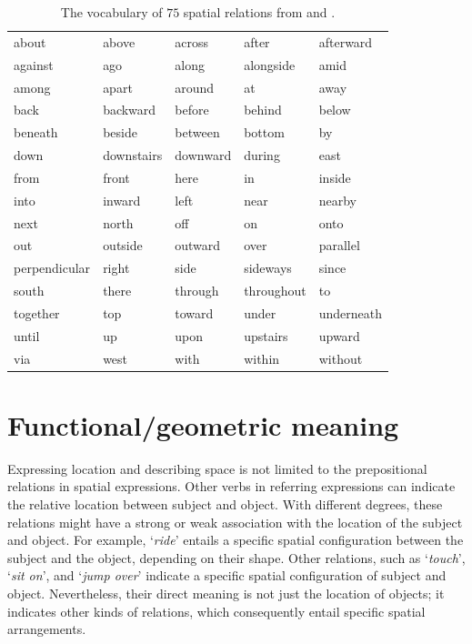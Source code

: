	
\begin{table}[t]
	\begin{tabular}{|lllll|}
		\hline
		about         & above         & across        & after         & afterward     \\
		against       & ago           & along         & alongside     & amid          \\
		among         & apart         & around        & at            & away          \\
		back          & backward      & before        & behind        & below         \\
		beneath       & beside        & between       & bottom        & by            \\
		down          & downstairs    & downward      & during        & east          \\
		from          & front         & here          & in            & inside        \\
		into          & inward        & left          & near          & nearby        \\
		next          & north         & off           & on            & onto          \\
		out           & outside       & outward       & over          & parallel      \\
		perpendicular & right         & side          & sideways      & since         \\
		south         & there         & through       & throughout    & to            \\
		together      & top           & toward        & under         & underneath    \\
		until         & up            & upon          & upstairs      & upward        \\
		via           & west          & with          & within        & without       \\
		\hline
	\end{tabular}
	\vspace{0.5em}
	\caption{The vocabulary of $75$ spatial relations from \cite{landau1993whence} and \cite{herskovits1986language}.}\label{tab:ch2:vocab}
\end{table}


\section{Functional/geometric meaning}
\label{sec:spatial:functional}
Expressing location and describing space is not limited to the prepositional relations in spatial expressions. Other verbs in referring expressions can indicate the relative location between subject and object. With different degrees, these relations might have a strong or weak association with the location of the subject and object. 
For example, `\emph{ride}' entails a specific spatial configuration between the subject and the object, depending on their shape. 
Other relations, such as `\emph{touch}', `\emph{sit on}', and `\emph{jump over}' indicate a specific spatial configuration of subject and object.
Nevertheless, their direct meaning is not just the location of objects; it indicates other kinds of relations, which consequently entail specific spatial arrangements. 

